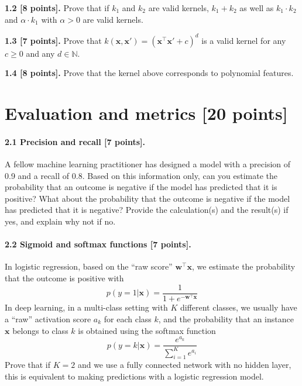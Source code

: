 \documentclass{article}
\begin{document}
\noindent\textbf{1.2 [8 points].} Prove that if $k_1$ and $k_2$ are valid kernels, $k_1+k_2$ as well as $k_1 \cdot k_2$ and $\alpha \cdot k_1$  with $\alpha>0$ are valid kernels.

\noindent\textbf{1.3 [7 points].} Prove that $k(\mathbf{x}, \mathbf{x}') = (\mathbf{x}^\top\mathbf{x}' + c)^d$ is a valid kernel for any $c \geq 0$ and any $d \in \mathbb{N}$.

\noindent\textbf{1.4 [8 points].} Prove that the kernel above corresponds to polynomial features.

\section{Evaluation and metrics [20 points]}

\paragraph{2.1 Precision and recall [7 points].} A fellow machine learning practitioner has designed a model with a precision of 0.9 and a recall of $0.8$. Based on this information only, can you estimate the probability that an outcome is negative if the model has predicted that it is positive? What about the probability that the outcome is negative if the model has predicted that it is negative? Provide the calculation(s) and the result(s) if yes, and explain why not if no.

\paragraph{2.2 Sigmoid and softmax functions [7 points].}
In logistic regression, based on the ``raw score'' $\mathbf{w}^\top\mathbf{x}$, we estimate the probability that the outcome is positive with
\begin{equation}
p(y=1|\mathbf{x}) = \frac{1}{1 + e^{-\mathbf{w}^\top\mathbf{x}}}
\end{equation}
In deep learning, in a multi-class setting with $K$ different classes, we usually have a ``raw'' activation score $a_k$ for each class $k$, and the probability that an instance $\mathbf{x}$ belongs to class $k$ is obtained using the softmax function
\begin{equation}
p(y=k|\mathbf{x}) = \frac{e^{a_k}}{\sum_{i=1}^K e^{a_i}}
\end{equation}
Prove that if $K=2$ and we use a fully connected network with no hidden layer, this is equivalent to making predictions with a logistic regression model.
\end{document}
